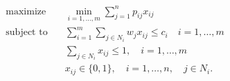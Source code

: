 \begin{align*}
\text{maximize} \quad & \min_{i=1, \ldots, m} \sum_{j=1}^n p_{ij} x_{ij} \\
\text{subject to} \quad & \sum_{i=1}^m \sum_{j \in N_i} w_j x_{ij} \leq c_i \quad i = 1, \ldots, m \\
& \sum_{j \in N_i} x_{ij} \leq 1, \quad i = 1, \ldots, m \\
& x_{ij} \in \lbrace 0, 1 \rbrace, \quad i = 1, \ldots, n, \quad j \in N_i.
\end{align*}
